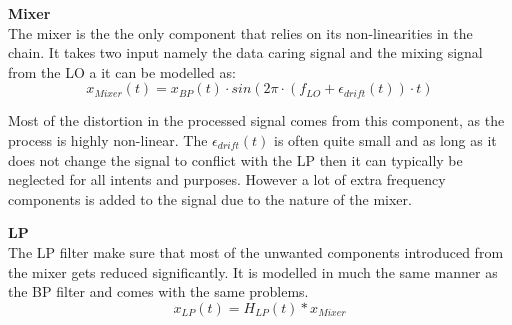 \textbf{Mixer}\\
The mixer is the the only component that relies on its non-linearities in the chain. It takes two input namely the data caring signal and the mixing signal from the \gls{LO} a it can be modelled as:
\begin{equation}
x_{Mixer}(t) = x_{BP}(t) \cdot sin\left(2\pi\cdot (f_{LO}+\epsilon_{drift}(t)) \cdot t\right)
\end{equation}
\begin{where}
\end{where}

Most of the distortion in the processed signal comes from this component, as the process is highly non-linear. The $\epsilon_{drift}(t)$ is often quite small and as long as it does not change the signal to conflict with the LP then it can typically be neglected for all intents and purposes. However a lot of extra frequency components is added to the signal due to the nature of the mixer.




\textbf{\Gls{LP}}\\
The LP filter make sure that most of the unwanted components introduced from the mixer gets reduced significantly. It is modelled in much the same manner as the BP filter and comes with the same problems. 
\begin{equation}
x_{LP}(t) = H_{LP}(t)*x_{Mixer}
\end{equation}
\begin{where}
\end{where}


